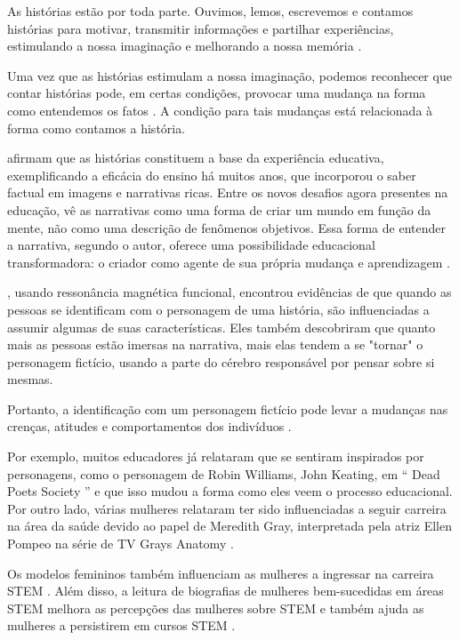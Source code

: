 As histórias estão por toda parte. Ouvimos, lemos, escrevemos e contamos histórias \citep{alterio_learning_2016} para motivar, transmitir informações e partilhar experiências, estimulando a nossa imaginação e melhorando a nossa memória \citep{alterio_learning_2016}.

Uma vez que as histórias estimulam a nossa imaginação, podemos reconhecer que contar histórias pode, em certas condições, provocar uma mudança na forma como entendemos os fatos \citep{alterio_learning_2016}. A condição para tais mudanças está relacionada à forma como contamos a história.

\citet{davis_engaging_2007} afirmam que as histórias constituem a base da experiência educativa, exemplificando a eficácia do ensino há muitos anos, que incorporou o saber factual em imagens e narrativas ricas. Entre os novos desafios agora presentes na educação, \citet{bruner_life_2004} vê as narrativas como uma forma de criar um mundo em função da mente, não como uma descrição de fenômenos objetivos.
Essa forma de entender a narrativa, segundo o autor, oferece uma possibilidade educacional transformadora: o criador como agente de sua própria mudança e aprendizagem \citep{bruner_life_2004}.

\citet{broom_becoming_2021}, usando ressonância magnética funcional, encontrou evidências de que quando as pessoas se identificam com o personagem de uma história, são influenciadas a assumir algumas de suas características.
Eles também descobriram que quanto mais as pessoas estão imersas na narrativa, mais elas tendem a se "tornar" o personagem fictício, usando a parte do cérebro responsável por pensar sobre si mesmas.

Portanto, a identificação com um personagem fictício pode levar a mudanças nas crenças, atitudes e comportamentos dos indivíduos \citep{oatley_meetings_1999}.

Por exemplo, muitos educadores já relataram que se sentiram inspirados por personagens, como o personagem de Robin Williams, John Keating, em `` Dead Poets Society '' \citep{noauthor_real_2014} e que isso mudou a forma como eles veem o processo educacional. Por outro lado, várias mulheres relataram ter sido influenciadas a seguir carreira na área da saúde devido ao papel de Meredith Gray, interpretada pela atriz Ellen Pompeo na série de TV Grays Anatomy \citep{news_greys_2017}.

Os modelos femininos também influenciam as mulheres a ingressar na carreira STEM \citep{cheryan_female_2011, corbett_solving_2015}. Além disso, a leitura de biografias de mulheres bem-sucedidas em áreas STEM melhora as percepções das mulheres sobre STEM \citep{shin_effects_2016} e também ajuda as mulheres a persistirem em cursos STEM \citep{herrmann_effects_2016}.

